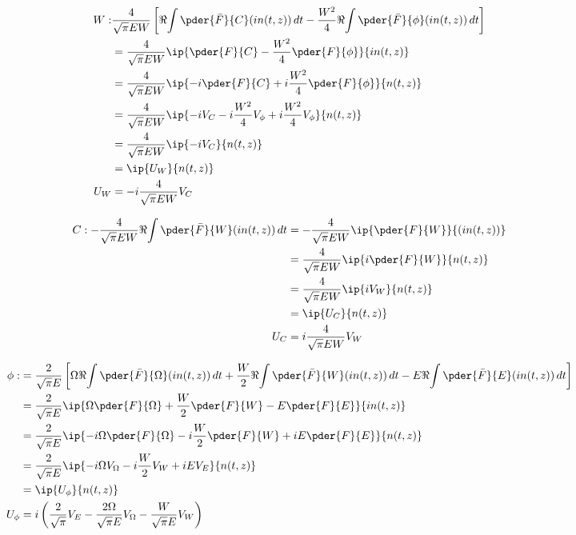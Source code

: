 \begin{equation}
\begin{split}
 W : &\frac{4}{  \sqrt{\pi}E W }\left[\Re{\int \pder{\bar{F}}{C} (in(t,z))\,dt} - \frac{W^2}{4}\Re{\int \pder{\bar{F}}{\phi} (in(t,z))\,dt}\right] \\
&= \frac{4}{  \sqrt{\pi}E W }\ip{\pder{F}{C} - \frac{W^2}{4} \pder{F}{\phi}}{ in(t,z)} \\
&= \frac{4}{  \sqrt{\pi}E W }\ip{-i\pder{F}{C} + i\frac{W^2}{4} \pder{F}{\phi}}{ n(t,z)} \\
&= \frac{4}{  \sqrt{\pi}E W }\ip{-iV_{C} - i \frac{W^2}{4}V_{\phi} + i\frac{W^2}{4}V_\phi}{ n(t,z)} \\
&= \frac{4}{  \sqrt{\pi}E W }\ip{-iV_{C}}{ n(t,z)} \\
&= \ip{U_{W}}{ n(t,z)} \\ 
U_{W} &= -i \frac{4}{ \sqrt{\pi}E W }V_{C}
\end{split}
\end{equation}



\begin{equation}
\begin{split}
C: - \frac{4}{\sqrt{\pi}EW}\Re{\int \pder{\bar{F}}{W} (in(t,z))\,dt} &=- \frac{4}{\sqrt{\pi}EW}\ip{\pder{F}{W}}{ (in(t,z))} \\
&=\frac{4}{\sqrt{\pi}EW}\ip{i\pder{F}{W}}{ n(t,z)} \\
&= \frac{4}{\sqrt{\pi}EW}\ip{i V_W}{ n(t,z)} \\
&= \ip{U_C}{ n(t,z)} \\
U_C &= i\frac{4}{\sqrt{\pi}EW} V_W
\end{split}
\end{equation}

\begin{equation}
\begin{split}
\phi :&=  \frac{2 }{\sqrt{\pi} E}\left[\Omega\Re{\int \pder{\bar{F}}{\Omega} (in(t,z))\,dt}  + \frac{W}{2}\Re{\int \pder{\bar{F}}{W} (in(t,z))\,dt}- E\Re{\int \pder{\bar{F}}{E} (in(t,z))\,dt{}}\right] \\
& = \frac{2}{\sqrt{\pi} E}\ip{\Omega\pder{F}{\Omega}+ \frac{W}{2} \pder{F}{W}- E\pder{F}{E}}{in(t,z)}\\
& = \frac{2}{\sqrt{\pi} E}\ip{-i\Omega \pder{F}{\Omega} - i \frac{W}{2} \pder{F}{W}+ i E \pder{F}{E}}{n(t,z)}\\
& = \frac{2}{\sqrt{\pi} E}\ip{-i\Omega V_{\Omega} - i \frac{W}{2} V_W + i E  V_E}{n(t,z)}\\
& = \ip{ U_{\phi}}{n(t,z)}\\
U_{\phi} & =  i \left(\frac{2}{\sqrt{\pi}} V_E - \frac{2\Omega}{\sqrt{\pi} E} V_{\Omega} -  \frac{W}{\sqrt{\pi} E} V_W \right)\\
\end{split}
\end{equation}

